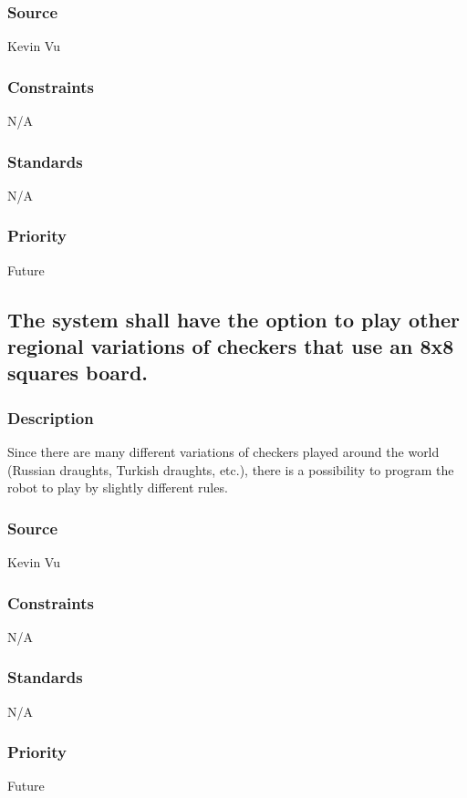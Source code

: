 \subsubsection{Source}
Kevin Vu
\subsubsection{Constraints}
N/A
\subsubsection{Standards}
N/A
\subsubsection{Priority}
Future

\subsection{The system shall have the option to play other regional variations of checkers that use an 8x8 squares board.}
\subsubsection{Description}
Since there are many different variations of checkers played around the world (Russian draughts, Turkish draughts, etc.), there is a possibility to program the robot to play by slightly different rules.
\subsubsection{Source}
Kevin Vu
\subsubsection{Constraints}
N/A
\subsubsection{Standards}
N/A
\subsubsection{Priority}
Future